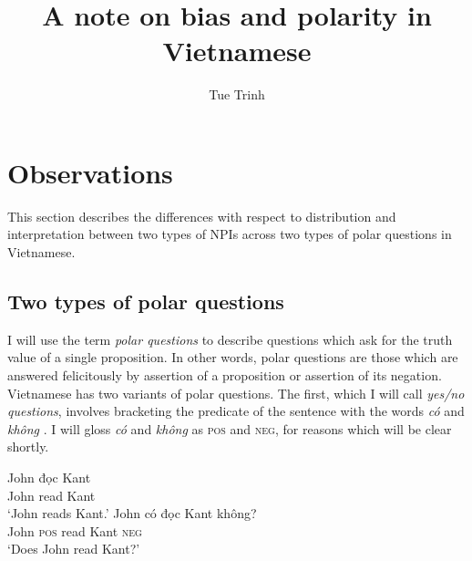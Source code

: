 \documentclass[output=paper,colorlinks,citecolor=brown]{langscibook}
\author{Tue Trinh\orcid{0000-0002-6362-0974}\affiliation{Leibniz-Zentrum Allgemeine Sprachwissenschaft}}
\title{A note on bias and polarity in Vietnamese}
\begin{document}
\maketitle


\section{Observations \label{observation} }

This section describes the differences with respect to distribution and interpretation between two types of NPIs across two types of polar questions in Vietnamese.

\subsection{Two types of polar questions \label{polar} }

I will use the term \textit{polar questions} to describe questions which ask for the truth value of a single proposition. In other words, polar questions are those which are answered felicitously by assertion of a proposition or assertion of its negation. %
Vietnamese has two variants of polar questions. The first, which I will call \textit{yes/no questions}, involves bracketing the predicate of the sentence with the words \textit{có} and \textit{không} \citep{trinh2005aspects, Duffield:2007}. I will gloss \textit{có} and \textit{không} as \textsc{pos} and \textsc{neg}, for reasons which will be clear shortly.%



\ea
	\ea
	\gll John đọc Kant\\
	John read Kant\\
	\glt `John reads Kant.'\label{kant}
	\ex
	\gll John có đọc Kant không?\\
	John \textsc{pos} read Kant \textsc{neg}\\
	\glt `Does John read Kant?'\label{cokantkhong}
	\z
\z
\end{document}
